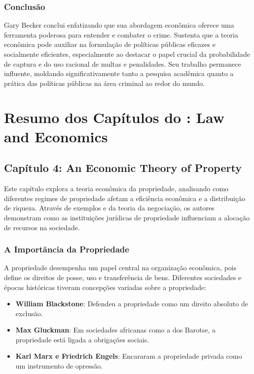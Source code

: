 \documentclass[a4paper,12pt]{article}[abntex2]
\begin{document}
\subsubsection{\textbf{Conclusão}}

Gary Becker conclui enfatizando que sua abordagem econômica oferece uma ferramenta poderosa para entender e combater o crime. Sustenta que a teoria econômica pode auxiliar na formulação de políticas públicas eficazes e socialmente eficientes, especialmente ao destacar o papel crucial da probabilidade de captura e do uso racional de multas e penalidades. Seu trabalho permanece influente, moldando significativamente tanto a pesquisa acadêmica quanto a prática das políticas públicas na área criminal ao redor do mundo.

\newpage
\section{\textbf{Resumo dos Capítulos do : Law and Economics}}
\subsection{\textbf{Capítulo 4: An Economic Theory of Property}}

Este capítulo explora a teoria econômica da propriedade, analisando como diferentes regimes de propriedade afetam a eficiência econômica e a distribuição de riqueza. Através de exemplos e da teoria da negociação, os autores demonstram como as instituições jurídicas de propriedade influenciam a alocação de recursos na sociedade.

\subsubsection{A Importância da Propriedade}
A propriedade desempenha um papel central na organização econômica, pois define os direitos de posse, uso e transferência de bens. Diferentes sociedades e épocas históricas tiveram concepções variadas sobre a propriedade:

\begin{itemize}
    \item \textbf{William Blackstone}: Defendeu a propriedade como um direito absoluto de exclusão.
    \item \textbf{Max Gluckman}: Em sociedades africanas como a dos Barotse, a propriedade está ligada a obrigações sociais.
    \item \textbf{Karl Marx e Friedrich Engels}: Encararam a propriedade privada como um instrumento de opressão.
\end{itemize}
\end{document}
